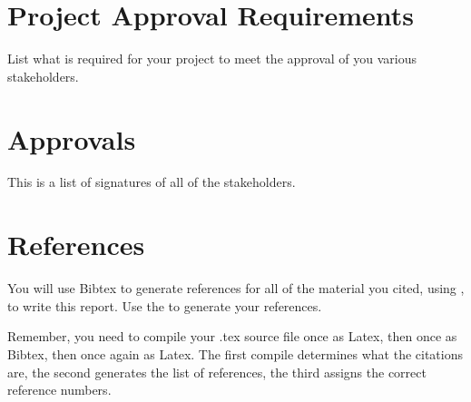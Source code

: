  \section{Project Approval Requirements}
 List what is required for your project to meet the approval of you various stakeholders.
 
 \section{Approvals}
 This is a list of signatures of all of the stakeholders.
 

\section*{References}
You will use Bibtex to generate references for all of the material you cited, using \cite{de1}, to write this report.
Use the to generate your references.

Remember, you need to compile your .tex source file once as Latex, then once as Bibtex, then once again as Latex.
The first compile determines what the citations are, the second generates the list of references, the third assigns
the correct reference numbers.

	
		
 

